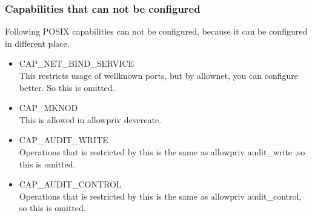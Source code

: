 \documentclass{article}
\begin{document}
\subsubsection{Capabilities that can not be configured}
Following POSIX capabilities can not be configured, because it can be
configured in different place. \\
\begin{itemize}
 \item CAP\_NET\_BIND\_SERVICE\\
       This restricts usage of wellknown ports, but by allownet, you can
       configure better. So this is omitted.
 \item CAP\_MKNOD\\
       This is allowed in allowpriv devcreate.
 \item CAP\_AUDIT\_WRITE\\
       Operations that is restricted by this is the same as
       allowpriv audit\_write ,so this  is omitted.
 \item CAP\_AUDIT\_CONTROL\\
       Operations that is  restricted by this is the same as allowpriv
       audit\_control, so this is  omitted.
\end{itemize}
\end{document}
